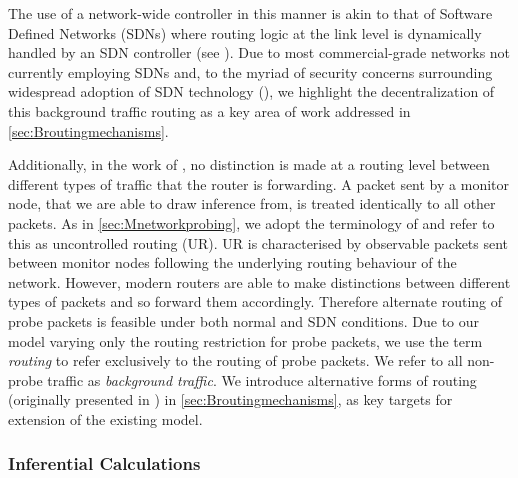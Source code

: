 The use of a network-wide controller in this manner is akin to that of Software Defined Networks (SDNs) where routing logic at the link level is dynamically handled by an SDN controller (see \cite{kreutz_software-defined_2015}). Due to most commercial-grade networks not currently employing SDNs and, to the myriad of security concerns surrounding widespread adoption of SDN technology (\cite{wood_scalable_2021}), we highlight the decentralization of this background traffic routing as a key area of work addressed in \cref{sec:Broutingmechanisms}.\par
Additionally, in the work of \cite{barnes_stochastic_2020}, no distinction is made at a routing level between different types of traffic that the router is forwarding. A packet sent by a monitor node, that we are able to draw inference from, is treated identically to all other packets. As in \cref{sec:Mnetworkprobing}, we adopt the terminology of \cite{he_network_2021} and refer to this as uncontrolled routing (UR). UR is characterised by observable packets sent between monitor nodes following the underlying routing behaviour of the network. However, modern routers are able to make distinctions between different types of packets and so forward them accordingly. Therefore alternate routing of probe packets is feasible under both normal and SDN conditions. Due to our model varying only the routing restriction for probe packets, we use the term \textit{routing} to refer exclusively to the routing of probe packets. We refer to all non-probe traffic as \textit{background traffic}. We introduce alternative forms of routing (originally presented in \cite{he_network_2021}) in \cref{sec:Broutingmechanisms}, as key targets for extension of the existing model.

\subsubsection*{Inferential Calculations}
\label{sssec:Iinferentialcalculations}

